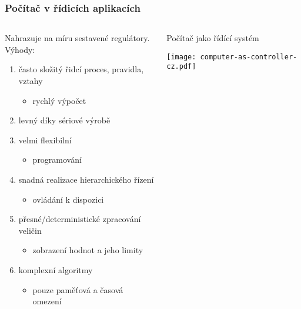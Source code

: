\documentclass{beamer}
\begin{document}
\begin{frame}
\frametitle{Počítač v řídicích aplikacích}

\begin{columns}
\begin{column}{0.58\textwidth}
Nahrazuje na míru sestavené regulátory. Výhody:
\begin{enumerate}
 \item často složitý řidcí proces, pravidla, vztahy
 \begin{itemize}
   \item rychlý výpočet
 \end{itemize}
 \item levný díky sériové výrobě
 \item velmi flexibilní
 \begin{itemize}
   \item programování
 \end{itemize}
 \item snadná realizace hierarchického řízení
 \begin{itemize}
   \item ovládání k dispozici
 \end{itemize}
 \item přesné/deterministické zpracování veličin
 \begin{itemize}
   \item zobrazení hodnot a jeho limity 
 \end{itemize}
 \item komplexní algoritmy
 \begin{itemize}
   \item pouze paměťová a časová omezení
 \end{itemize}
\end{enumerate}
  \vfil
\end{column}
\begin{column}{0.42\textwidth}
  \begin{center}
    Počítač jako řídící systém

    \vspace{5mm}

    \texttt{[image: computer-as-controller-cz.pdf]}
  \end{center}
\end{column}
\end{columns}
\end{frame}
\end{document}
